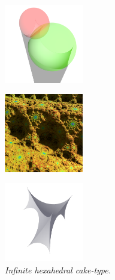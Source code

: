 \begin{figure}[htbp]
 \begin{minipage}[t]{0.5\textwidth}
  \begin{minipage}[t]{0.24\textwidth}
  \centering
  \includegraphics[width=1.35in, height=1.35in, keepaspectratio]{./img/application/sphairahedron/variations/hexahedralCake2/prism.png}
   \label{fig:cake-limit-inf-sphaira}
  \end{minipage}
  \hspace*{\fill}
  \begin{minipage}[t]{0.24\textwidth}
  \centering
  \includegraphics[width=1.35in, height=1.35in, keepaspectratio]{./img/application/sphairahedron/variations/hexahedralCake2/limit0644.png}
   \label{fig:cake-limit-inf-limit}
  \end{minipage}
  \hspace*{\fill}
  \caption{\textit{Infinite hexahedral cake-type.}}
  \label{fig:cake-limit-inf}
 \end{minipage}
 \begin{minipage}[t]{0.5\textwidth}
  \begin{minipage}[t]{0.24\textwidth}
   \centering
   \includegraphics[width=1.35in, height=1.35in, keepaspectratio]{./img/application/sphairahedron/variations/hexahedralCake2/sphairahedron.png}
  \end{minipage}

\end{minipage}
\end{figure}
